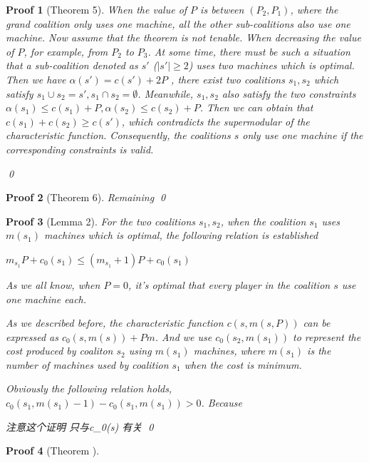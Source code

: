 \documentclass[UTF8]{article}
\newtheorem{pf}{\hspace{2em}Proof}
\begin{document}
\begin{pf}[Theorem 5]

When the value of $P$ is between $(P_2,P_1)$, where the grand coalition only uses one machine, all the other sub-coalitions also use one machine. Now assume that the theorem is not tenable. When decreasing the value of $P$, for example, from $P_2$ to $P_3$. At some time, there must be such a situation that a sub-coalition denoted as $s'$ ($|s'| \geq 2 $) uses two machines which is optimal. Then we have $ \alpha(s') = c(s') +2P $ , there exist two coalitions $s_1,s_2$ which satisfy $ s_1 \cup s_2 = s',s_1 \cap s_2 = \emptyset $.
Meanwhile, $s_1,s_2$ also satisfy the two constraints $\alpha(s_1) \leq c(s_1) + P , \alpha(s_2) \leq c(s_2) + P $. Then we can obtain that $ c(s_1) + c(s_2) \geq c(s') $, which contradicts the supermodular of the characteristic function.
Consequently, the coalitions $s$ only use one machine if the corresponding constraints is valid.

\qed
\end{pf}

\begin{pf}[Theorem 6]

Remaining
\qed
\end{pf}

\begin{pf}[Lemma 2]

For the two coalitions $s_1, s_2$, when the coalition $s_1$ uses $m(s_1)$ machines which is optimal, the following relation is established

$m_{s_1}P+c_0(s_1) \leq (m_{s_1}+1)P+c_0(s_1)$

As we all know, when $ P=0 $, it's optimal that every player in the coalition $s$ use one machine each.

As we described before, the characteristic function $c(s,m(s,P))$ can be expressed as $c_0(s,m(s))+Pm$. And we use $c_0(s_2,m(s_1))$ to represent the cost produced by coaliton $s_2$ using $m(s_1)$ machines, where $m(s_1)$ is the number of machines used by coalition $s_1$ when the cost is minimum.

Obviously the following relation holds, $c_0(s_1,m(s_1)-1)-c_0(s_1,m(s_1))>0$.
Because

注意这个证明  只与c_0(s) 有关
\qed
\end{pf}

\begin{pf}[Theorem ]

\end{pf}
\end{document}

